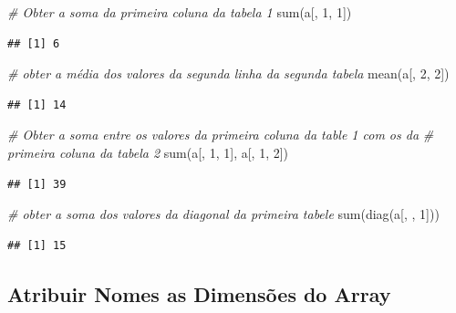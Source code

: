 \documentclass[
]{article}
\newenvironment{Shaded}{\begin{snugshade}}{\end{snugshade}}
\newcommand{\CommentTok}[1]{\textcolor[rgb]{0.56,0.35,0.01}{\textit{#1}}}
\newcommand{\DecValTok}[1]{\textcolor[rgb]{0.00,0.00,0.81}{#1}}
\newcommand{\FunctionTok}[1]{\textcolor[rgb]{0.00,0.00,0.00}{#1}}
\newcommand{\NormalTok}[1]{#1}
\begin{document}
\begin{Shaded}
\begin{Highlighting}[]
\CommentTok{\# Obter a soma da primeira coluna da tabela 1}
\FunctionTok{sum}\NormalTok{(a[, }\DecValTok{1}\NormalTok{, }\DecValTok{1}\NormalTok{])}
\end{Highlighting}
\end{Shaded}

\begin{verbatim}
## [1] 6
\end{verbatim}

\begin{Shaded}
\begin{Highlighting}[]
\CommentTok{\# obter a média dos valores da segunda linha da segunda tabela}
\FunctionTok{mean}\NormalTok{(a[, }\DecValTok{2}\NormalTok{, }\DecValTok{2}\NormalTok{])}
\end{Highlighting}
\end{Shaded}

\begin{verbatim}
## [1] 14
\end{verbatim}

\begin{Shaded}
\begin{Highlighting}[]
\CommentTok{\# Obter a soma entre os valores da primeira coluna da table 1 com os da}
\CommentTok{\# primeira coluna da tabela 2}
\FunctionTok{sum}\NormalTok{(a[, }\DecValTok{1}\NormalTok{, }\DecValTok{1}\NormalTok{], a[, }\DecValTok{1}\NormalTok{, }\DecValTok{2}\NormalTok{])}
\end{Highlighting}
\end{Shaded}

\begin{verbatim}
## [1] 39
\end{verbatim}

\begin{Shaded}
\begin{Highlighting}[]
\CommentTok{\# obter a soma dos valores da diagonal da primeira tabele}
\FunctionTok{sum}\NormalTok{(}\FunctionTok{diag}\NormalTok{(a[, , }\DecValTok{1}\NormalTok{]))}
\end{Highlighting}
\end{Shaded}

\begin{verbatim}
## [1] 15
\end{verbatim}

\hypertarget{atribuir-nomes-as-dimensuxf5es-do-array}{%
\subsection{Atribuir Nomes as Dimensões do
Array}\label{atribuir-nomes-as-dimensuxf5es-do-array}}
\end{document}
